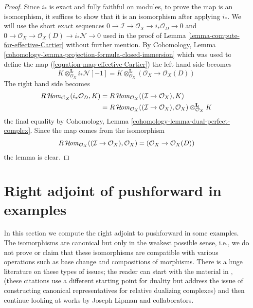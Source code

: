\begin{proof}
Since $i_*$ is exact and fully faithful on modules, to prove the map is an
isomorphism, it suffices to show that it is an isomorphism after applying
$i_*$. We will use the short exact sequences
$0 \to \mathcal{I} \to \mathcal{O}_X \to i_*\mathcal{O}_D \to 0$
and
$0 \to \mathcal{O}_X \to \mathcal{O}_X(D) \to i_*\mathcal{N} \to 0$
used in the proof of Lemma \ref{lemma-compute-for-effective-Cartier}
without further mention. By
Cohomology, Lemma \ref{cohomology-lemma-projection-formula-closed-immersion}
which was used to define the map (\ref{equation-map-effective-Cartier})
the left hand side becomes
$$
K \otimes_{\mathcal{O}_X}^\mathbf{L} i_*\mathcal{N}[-1] =
K \otimes_{\mathcal{O}_X}^\mathbf{L} (\mathcal{O}_X \to \mathcal{O}_X(D))
$$
The right hand side becomes
\begin{align*}
R\mathop{\mathcal{H}\!\mathit{om}}\nolimits_{\mathcal{O}_X}(i_*\mathcal{O}_D, K) & =
R\mathop{\mathcal{H}\!\mathit{om}}\nolimits_{\mathcal{O}_X}((\mathcal{I} \to \mathcal{O}_X), K) \\
& =
R\mathop{\mathcal{H}\!\mathit{om}}\nolimits_{\mathcal{O}_X}((\mathcal{I} \to \mathcal{O}_X), \mathcal{O}_X)
\otimes_{\mathcal{O}_X}^\mathbf{L} K
\end{align*}
the final equality by
Cohomology, Lemma \ref{cohomology-lemma-dual-perfect-complex}.
Since the map comes from the isomorphism
$$
R\mathop{\mathcal{H}\!\mathit{om}}\nolimits_{\mathcal{O}_X}((\mathcal{I} \to \mathcal{O}_X), \mathcal{O}_X)
= (\mathcal{O}_X \to \mathcal{O}_X(D))
$$
the lemma is clear.
\end{proof}





\section{Right adjoint of pushforward in examples}
\label{section-examples}

\noindent
In this section we compute the right adjoint to pushforward in
some examples. The isomorphisms are canonical but only in the weakest
possible sense, i.e., we do not prove or claim that these isomorphisms are
compatible with various operations such as base change and compositions
of morphisms. There is a huge literature on these types of issues; the reader
can start with the material in \cite{RD}, \cite{Conrad-GD}
(these citations use a different starting point for duality but address the
issue of constructing canonical representatives for relative dualizing
complexes) and then continue looking at works by
Joseph Lipman and collaborators.


